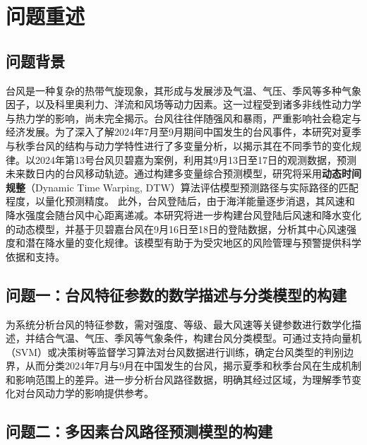 \documentclass[withoutpreface,bwprint]{cumcmthesis}
\begin{document}
\begin{center}
    \tableofcontents  %
\end{center}

\cleardoublepage  %

\newpage
\section{问题重述}

\subsection{问题背景}
台风是一种复杂的热带气旋现象，其形成与发展涉及气温、气压、季风等多种气象因子，以及科里奥利力、洋流和风场等动力因素。这一过程受到诸多非线性动力学与热力学的影响，尚未完全揭示。台风往往伴随强风和暴雨，严重影响社会稳定与经济发展。为了深入了解2024年7月至9月期间中国发生的台风事件，本研究对夏季与秋季台风的结构与动力学特性进行了多变量分析，以揭示其在不同季节的变化规律。以2024年第13号台风贝碧嘉为案例，利用其9月13日至17日的观测数据，预测未来数日内的台风移动轨迹。通过构建多变量综合预测模型，研究将采用\textbf{动态时间规整}（Dynamic Time Warping, DTW）算法评估模型预测路径与实际路径的匹配程度，以量化预测精度。
此外，台风登陆后，由于海洋能量逐步消退，其风速和降水强度会随台风中心距离递减。本研究将进一步构建台风登陆后风速和降水变化的动态模型，并基于贝碧嘉台风在9月16日至18日的登陆数据，分析其中心风速强度和潜在降水量的变化规律。该模型有助于为受灾地区的风险管理与预警提供科学依据和支持。

\subsection{问题一：台风特征参数的数学描述与分类模型的构建}

为系统分析台风的特征参数，需对强度、等级、最大风速等关键参数进行数学化描述，并结合气温、气压、季风等气象条件，构建台风分类模型。可通过支持向量机（SVM）或决策树等监督学习算法对台风数据进行训练，确定台风类型的判别边界，从而分类2024年7月与9月在中国发生的台风，揭示夏季和秋季台风在生成机制和影响范围上的差异。进一步分析台风路径数据，明确其经过区域，为理解季节变化对台风动力学的影响提供参考。

\subsection{问题二：多因素台风路径预测模型的构建}
\end{document}

